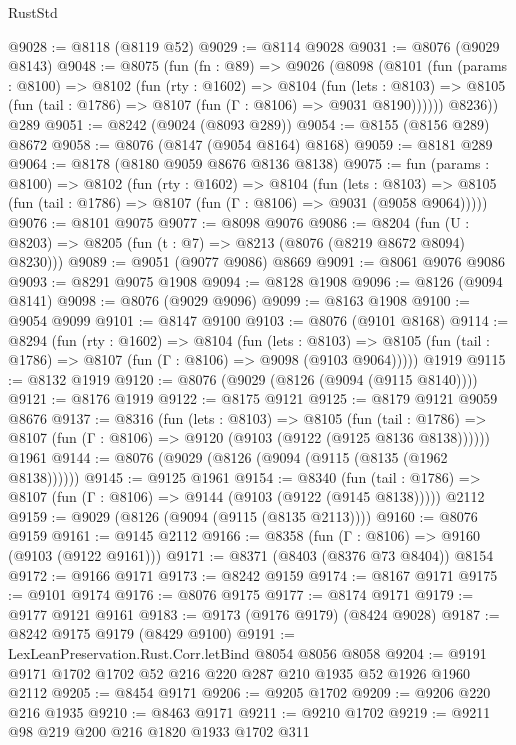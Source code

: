 \begin{lexlean}{RustStd}
\begin{coremodule}
@9028 := @8118 (@8119 @52)
@9029 := @8114 @9028
@9031 := @8076 (@9029 @8143)
@9048 := @8075
    (fun (fn : @89) =>
    @9026
      (@8098
        (@8101
          (fun (params : @8100) =>
          @8102
            (fun (rty : @1602) =>
            @8104
              (fun (lets : @8103) =>
              @8105 (fun (tail : @1786) => @8107 (fun (Γ : @8106) => @9031 @8190))))))
        @8236))
    @289
@9051 := @8242 (@9024 (@8093 @289))
@9054 := @8155 (@8156 @289) @8672
@9058 := @8076 (@8147 (@9054 @8164) @8168)
@9059 := @8181 @289
@9064 := @8178 (@8180 @9059 @8676 @8136 @8138)
@9075 := fun (params : @8100) =>
  @8102
    (fun (rty : @1602) =>
    @8104
      (fun (lets : @8103) =>
      @8105 (fun (tail : @1786) => @8107 (fun (Γ : @8106) => @9031 (@9058 @9064)))))
@9076 := @8101 @9075
@9077 := @8098 @9076
@9086 := @8204 (fun (U : @8203) => @8205 (fun (t : @7) => @8213 (@8076 (@8219 @8672 @8094) @8230)))
@9089 := @9051 (@9077 @9086) @8669
@9091 := @8061 @9076 @9086
@9093 := @8291 @9075 @1908
@9094 := @8128 @1908
@9096 := @8126 (@9094 @8141)
@9098 := @8076 (@9029 @9096)
@9099 := @8163 @1908
@9100 := @9054 @9099
@9101 := @8147 @9100
@9103 := @8076 (@9101 @8168)
@9114 := @8294
    (fun (rty : @1602) =>
    @8104
      (fun (lets : @8103) =>
      @8105 (fun (tail : @1786) => @8107 (fun (Γ : @8106) => @9098 (@9103 @9064)))))
    @1919
@9115 := @8132 @1919
@9120 := @8076 (@9029 (@8126 (@9094 (@9115 @8140))))
@9121 := @8176 @1919
@9122 := @8175 @9121
@9125 := @8179 @9121 @9059 @8676
@9137 := @8316
    (fun (lets : @8103) =>
    @8105
      (fun (tail : @1786) => @8107 (fun (Γ : @8106) => @9120 (@9103 (@9122 (@9125 @8136 @8138))))))
    @1961
@9144 := @8076 (@9029 (@8126 (@9094 (@9115 (@8135 (@1962 @8138))))))
@9145 := @9125 @1961
@9154 := @8340
    (fun (tail : @1786) => @8107 (fun (Γ : @8106) => @9144 (@9103 (@9122 (@9145 @8138)))))
    @2112
@9159 := @9029 (@8126 (@9094 (@9115 (@8135 @2113))))
@9160 := @8076 @9159
@9161 := @9145 @2112
@9166 := @8358 (fun (Γ : @8106) => @9160 (@9103 (@9122 @9161)))
@9171 := @8371 (@8403 (@8376 @73 @8404)) @8154
@9172 := @9166 @9171
@9173 := @8242 @9159
@9174 := @8167 @9171
@9175 := @9101 @9174
@9176 := @8076 @9175
@9177 := @8174 @9171
@9179 := @9177 @9121 @9161
@9183 := @9173 (@9176 @9179) (@8424 @9028)
@9187 := @8242 @9175 @9179 (@8429 @9100)
@9191 := LexLeanPreservation.Rust.Corr.letBind @8054 @8056 @8058
@9204 := @9191 @9171 @1702 @1702 @52 @216 @220 @287 @210 @1935 @52 @1926 @1960 @2112
@9205 := @8454 @9171
@9206 := @9205 @1702
@9209 := @9206 @220 @216 @1935
@9210 := @8463 @9171
@9211 := @9210 @1702
@9219 := @9211 @98 @219 @200 @216 @1820 @1933 @1702 @311

\end{coremodule}
\end{lexlean}
